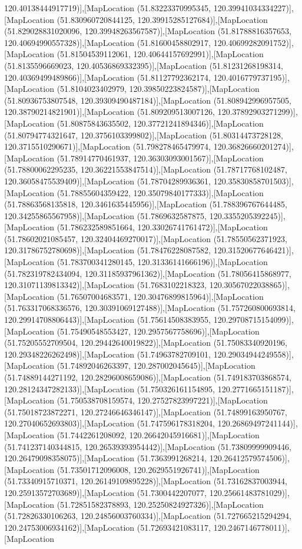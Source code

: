 120.40138444917719)],[MapLocation (51.83223370995345, 120.39941034334227)],[MapLocation (51.830960720844125, 120.39915285127684)],[MapLocation (51.829028831020096, 120.39948263567587)],[MapLocation (51.81788816357653, 120.40694990557328)],[MapLocation (51.81600458802917, 120.40699282091752)],[MapLocation (51.81504539112061, 120.40644157692991)],[MapLocation (51.8135596669023, 120.40536869332395)],[MapLocation (51.81231268198314, 120.40369499489866)],[MapLocation (51.81127792362174, 120.4016779737195)],[MapLocation (51.8104023402979, 120.39850223824587)],[MapLocation (51.80936753807548, 120.39309490487184)],[MapLocation (51.808942996957505, 120.38790214821901)],[MapLocation (51.809209513007126, 120.37892903271299)],[MapLocation (51.80875843635502, 120.37721241894346)],[MapLocation (51.80794774321647, 120.3756103399802)],[MapLocation (51.80314473728128, 120.3715510290671)],[MapLocation (51.798278465479974, 120.36826660201274)],[MapLocation (51.78914770461937, 120.36303093001567)],[MapLocation (51.78800062295235, 120.36221553847514)],[MapLocation (51.78717768102487, 120.36058475539409)],[MapLocation (51.78704289936361, 120.35830858701503)],[MapLocation (51.78855604359422, 120.35079840177333)],[MapLocation (51.78863568135818, 120.3461635445956)],[MapLocation (51.788396767644485, 120.34255865567958)],[MapLocation (51.7869632587875, 120.3355205392245)],[MapLocation (51.786232589851664, 120.33026741761472)],[MapLocation (51.78602021085457, 120.32404469270017)],[MapLocation (51.78550562371923, 120.31786752780698)],[MapLocation (51.78476228087582, 120.31520677646421)],[MapLocation (51.783700341280145, 120.31336141666196)],[MapLocation (51.782319782434094, 120.31185937961362)],[MapLocation (51.78056415868977, 120.31071139813342)],[MapLocation (51.7683102218323, 120.30567022038865)],[MapLocation (51.76507004683571, 120.30476899815964)],[MapLocation (51.763317068336576, 120.30391069127488)],[MapLocation (51.757260800693814, 120.29914708806443)],[MapLocation (51.75614508383955, 120.29708715154099)],[MapLocation (51.75490548553427, 120.2957567758696)],[MapLocation (51.75205552709504, 120.29442640019822)],[MapLocation (51.75083340920196, 120.29348226262498)],[MapLocation (51.74963782709101, 120.29034944249558)],[MapLocation (51.74892046263397, 120.287002045645)],[MapLocation (51.74889144271192, 120.28296008659086)],[MapLocation (51.749183703868574, 120.28124347282133)],[MapLocation (51.750326161154895, 120.2771665151187)],[MapLocation (51.750538708159574, 120.27527823997221)],[MapLocation (51.75018723872271, 120.27246646346147)],[MapLocation (51.74899163950767, 120.27040652693803)],[MapLocation (51.747596178318204, 120.26869497241144)],[MapLocation (51.7442261208092, 120.26642045916681)],[MapLocation (51.741237140344815, 120.26539393954442)],[MapLocation (51.73809999909446, 120.26479098358075)],[MapLocation (51.7363991268214, 120.26412579574506)],[MapLocation (51.73501712096008, 120.2629551926741)],[MapLocation (51.73340915710371, 120.26149109895228)],[MapLocation (51.73162837003944, 120.25913572703689)],[MapLocation (51.7300442207077, 120.25661483781029)],[MapLocation (51.72851582378893, 120.25250824927326)],[MapLocation (51.72826330106263, 120.24856003760334)],[MapLocation (51.727665215294294, 120.24753006934162)],[MapLocation (51.72693421083117, 120.2467146778011)],[MapLocation 